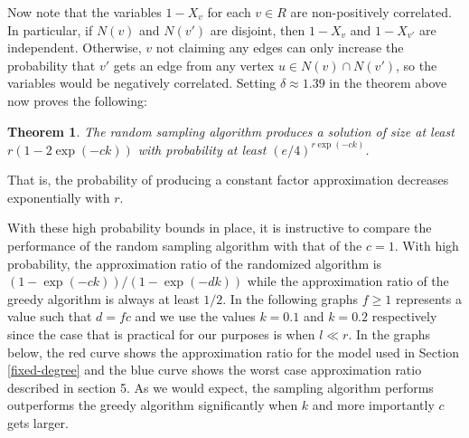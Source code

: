 \documentclass[11pt]{article}
\newtheorem{thm}{Theorem}
\begin{document}
Now note that the variables $1-X_v$ for each $v\in R$ are
non-positively correlated. In particular, if $N(v)$ and $N(v')$ are
disjoint, then $1-X_v$ and $1-X_{v'}$ are independent. Otherwise, $v$
not claiming any edges can only increase the probability that $v'$
gets an edge from any vertex $u\in N(v)\cap N(v')$, so the variables
would be negatively correlated. Setting $\delta\approx 1.39$ in the
theorem above now proves the following:

\begin{thm}
The random sampling algorithm produces a solution of size at least $r(1-2\exp(-ck))$ with probability at least $(e/4)^{r\exp(-ck)}$.
\end{thm}

That is, the probability of producing a constant factor approximation decreases exponentially with $r$.

With these high probability bounds in place, it is instructive to
compare the performance of the random sampling algorithm with that of
the $c=1$. With high probability, the approximation ratio of the
randomized algorithm is $(1-\exp(-ck))/(1-\exp(-dk))$ while the
approximation ratio of the greedy algorithm is always at least
$1/2$. In the following graphs $f\geq 1$ represents a value such that
$d=fc$ and we use the values $k=0.1$ and $k=0.2$ respectively since
the case that is practical for our purposes is when $l \ll r$. In the
graphs below, the red curve shows the approximation ratio for the
model used in Section \ref{fixed-degree} and the blue curve shows the
worst case approximation ratio described in section 5. As we would
expect, the sampling algorithm performs outperforms the greedy
algorithm significantly when $k$ and more importantly $c$ gets larger.
\end{document}
